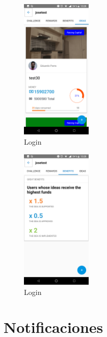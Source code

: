 \begin{figure}[!h]
	\begin{center}
		\includegraphics[width=0.3\textwidth]{./img/anexo1/ver_desafio_ideas.png}
		\caption{Login}
		\label{fig:ver_desafio_inicio_ideas}
	\end{center}
\end{figure}

\begin{figure}[!h]
	\begin{center}
		\includegraphics[width=0.3\textwidth]{./img/anexo1/ver_desafio_beneficios.png}
		\caption{Login}
		\label{fig:ver_desafio_inicio_beneficios}
	\end{center}
\end{figure}


\section{Notificaciones}

